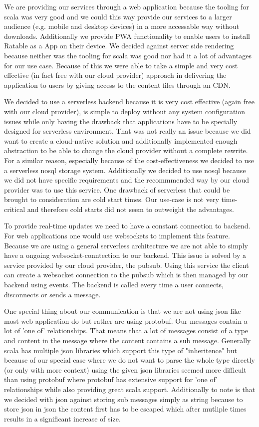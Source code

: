\documentclass[
	ngerman,
	ruledheaders=section,   %
	class=report,		    %
	thesis={type=bachelor}, %
	accentcolor=9c,			%
	custommargins=true,    %
	marginpar=false,        %
	parskip=half-,          %
	fontsize=11pt,          %
]{tudapub}
\begin{document}

We are providing our services through a web application because the tooling for scala was very good and we could this way provide our services to a larger audience (e.g. mobile and desktop devices) in a more accessable way without downloads. Additionally we provide PWA functionality to enable users to install Ratable as a App on their device. We decided against server side rendering because neither was the tooling for scala was good nor had it a lot of advantages for our use case. Because of this we were able to take a simple and very cost effective (in fact free with our cloud provider) approach in delivering the application to users by giving access to the content files through an CDN. 

We decided to use a serverless backend because it is very cost effective (again free with our cloud provider), is simple to deploy without any system configuration issues while only having the drawback that applications have to be specially designed for serverless environment. That was not really an issue because we did want to create a cloud-native solution and additionally implemented enough abstraction to be able to change the cloud provider without a complete rewrite. For a similar reason, especially because of the cost-effectiveness we decided to use a serverless nosql storage system. Additionally we decided to use nosql because we did not have specific requirements and the recommmended way by our cloud provider was to use this service. One drawback of serverless that could be brought to consideration are cold start times. Our use-case is not very time-critical and therefore cold starts did not seem to outweight the advantages.

To provide real-time updates we need to have a constant connection to backend. For web applications one would use websockets to implement this feature. Because we are using a general serverless architecture we are not able to simply have a ongoing websocket-conntection to our backend. This issue is solved by a service provided by our cloud provider, the pubsub. Using this service the client can create a websocket connection to the pubsub which is then managed by our backend using events. The backend is called every time a user connects, disconnects or sends a message.

One special thing about our communication is that we are not using json like most web application do but rather are using protobuf. Our messages contain a lot of 'one of' relationships. That means that a lot of messages consist of a type and content in the message where the content contains a sub message. Generally scala has multiple json libraries which support this type of "inheritence" but because of our special case where we do not want to parse the whole type directly (or only with more context) using the given json libraries seemed more difficult than using protobuf where protobuf has extensive support for 'one of' relationships while also providing great scala support. Additionally to note is that we decided with json against storing sub messages simply as string because to store json in json the content first has to be escaped which after mutliple times results in a significant increase of size.
\end{document}
